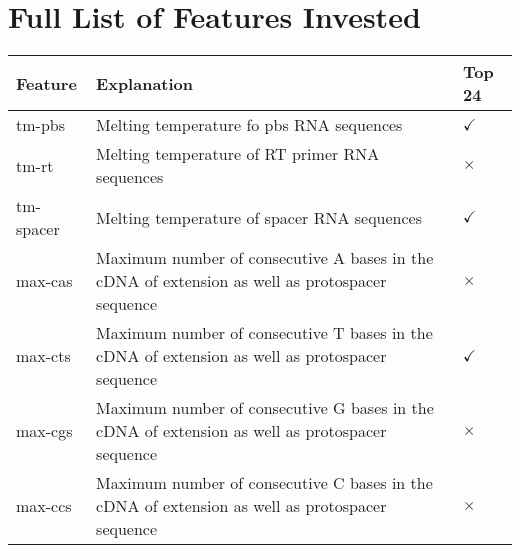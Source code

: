\chapter{Full List of Features Invested}
\label{appendix:features}

\begin{table}[ht]
    \centering
    \begin{tabular}{|p{}|p{}|p{}|}
        \hline
        \textbf{Feature} & \textbf{Explanation} & \textbf{Top 24} \\ 
        \hline
        tm-pbs& Melting temperature fo pbs RNA sequences & $\checkmark$ \\
        \hline
        tm-rt& Melting temperature of RT primer RNA sequences & $\times$ \\
        \hline
        tm-spacer& Melting temperature of spacer RNA sequences & $\checkmark$ \\
        \hline
        max-cas & Maximum number of consecutive A bases in the cDNA of extension as well as protospacer sequence & $\times$ \\
        \hline
        max-cts & Maximum number of consecutive T bases in the cDNA of extension as well as protospacer sequence & $\checkmark$ \\
        \hline
        max-cgs & Maximum number of consecutive G bases in the cDNA of extension as well as protospacer sequence & $\times$ \\
        \hline
        max-ccs & Maximum number of consecutive C bases in the cDNA of extension as well as protospacer sequence & $\times$ \\
        \hline
    \end{tabular}
\end{table}